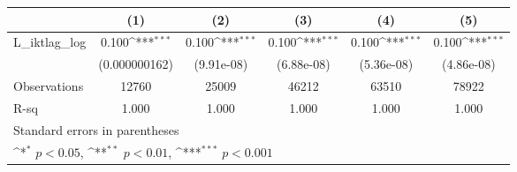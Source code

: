 {
\def\sym#1{\ifmmode^{#1}\else\(^{#1}\)\fi}
\begin{tabular}{l*{5}{c}}
\hline\hline
                &\multicolumn{1}{c}{(1)}         &\multicolumn{1}{c}{(2)}         &\multicolumn{1}{c}{(3)}         &\multicolumn{1}{c}{(4)}         &\multicolumn{1}{c}{(5)}         \\
\hline
L\_iktlag\_log    &    0.100\sym{***}&    0.100\sym{***}&    0.100\sym{***}&    0.100\sym{***}&    0.100\sym{***}\\
                &(0.000000162)         &(9.91e-08)         &(6.88e-08)         &(5.36e-08)         &(4.86e-08)         \\
\hline
Observations    &    12760         &    25009         &    46212         &    63510         &    78922         \\
R-sq            &    1.000         &    1.000         &    1.000         &    1.000         &    1.000         \\
\hline\hline
\multicolumn{6}{l}{\footnotesize Standard errors in parentheses}\\
\multicolumn{6}{l}{\footnotesize \sym{*} \(p<0.05\), \sym{**} \(p<0.01\), \sym{***} \(p<0.001\)}\\
\end{tabular}
}
